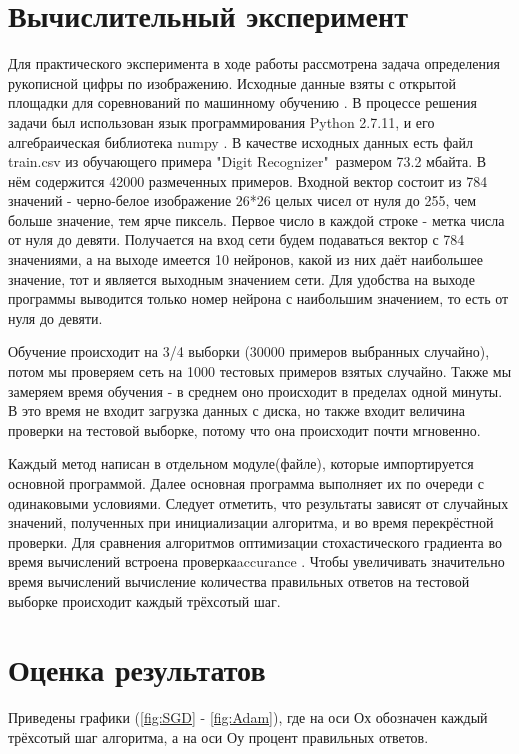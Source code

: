 \documentclass[oneside,final,14pt]{extreport}
\begin{document}
\section{Вычислительный эксперимент} 
Для практического эксперимента в ходе работы рассмотрена задача определения рукописной цифры по изображению. Исходные данные взяты с открытой площадки для соревнований по машинному обучению \cite{kaggle:com}.
В процессе решения задачи был использован язык программирования Python 2.7.11, и его алгебраическая библиотека numpy \cite{numpy:package}.
В качестве исходных данных есть файл train.csv из обучающего примера "Digit Recognizer"\  размером 73.2 мбайта. В нём содержится 42000 размеченных примеров. Входной вектор состоит из 784 значений - черно-белое изображение 26*26 целых чисел от нуля до 255, чем больше значение, тем ярче пиксель. Первое число в каждой строке - метка числа от нуля до девяти.
Получается на вход сети будем подаваться вектор с 784 значениями, а на выходе имеется 10 нейронов, какой из них даёт наибольшее значение, тот и является выходным значением сети. Для удобства на выходе программы выводится только номер нейрона с наибольшим значением, то есть от нуля до девяти. 

Обучение происходит на 3/4 выборки (30000 примеров выбранных случайно), потом мы проверяем сеть на 1000 тестовых примеров взятых случайно. Также мы замеряем время обучения - в среднем оно происходит в пределах одной минуты. В это время не входит загрузка данных с диска, но также входит величина проверки на тестовой выборке, потому что она происходит почти мгновенно.

Каждый метод написан в отдельном модуле(файле), которые импортируется основной программой. Далее основная программа выполняет их по очереди с одинаковыми условиями.
Следует отметить, что результаты зависят от случайных значений, полученных при инициализации алгоритма, и во время перекрёстной проверки. 
Для сравнения алгоритмов оптимизации стохастического градиента во время вычислений встроена проверка\ttfamily accurance \normalfont. Чтобы увеличивать значительно время вычислений вычисление количества правильных ответов на тестовой выборке происходит каждый трёхсотый шаг. 
\section{Оценка результатов}
Приведены графики (\ref{fig:SGD} - \ref{fig:Adam}), где на оси Ох обозначен каждый трёхсотый шаг алгоритма, а на оси Оу процент правильных ответов.  
\end{document}
